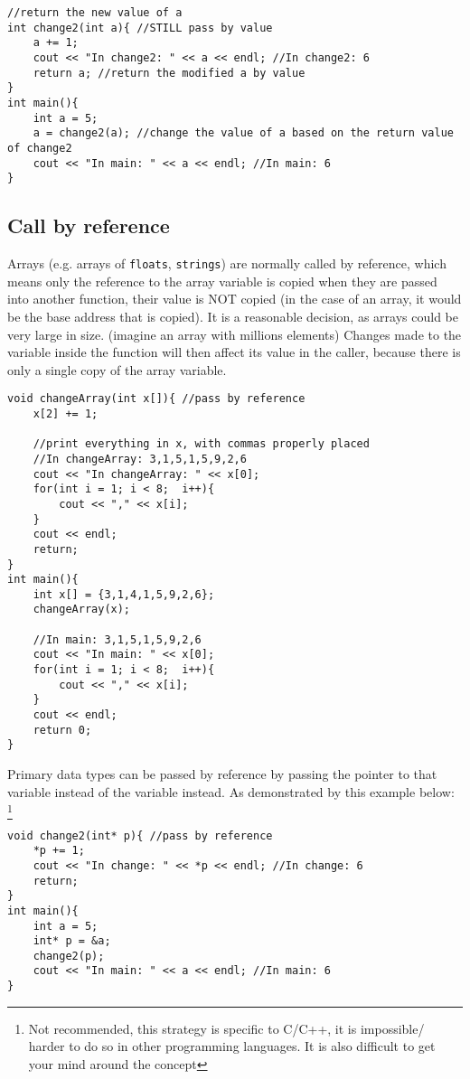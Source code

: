 \begin{lstlisting}
//return the new value of a
int change2(int a){ //STILL pass by value
    a += 1;
    cout << "In change2: " << a << endl; //In change2: 6
    return a; //return the modified a by value
}
int main(){
    int a = 5;
    a = change2(a); //change the value of a based on the return value of change2
    cout << "In main: " << a << endl; //In main: 6
}
\end{lstlisting}

\subsection{Call by reference}

Arrays (e.g. arrays of \texttt{floats}, \texttt{strings}) are normally called by reference, which means only the reference to the array variable is copied when they are passed into another function, their value is NOT copied (in the case of an array, it would be the base address that is copied). It is a reasonable decision, as arrays could be very large in size. (imagine an array with millions elements) Changes made to the variable inside the function will then affect its value in the caller, because there is only a single copy of the array variable.

\begin{lstlisting}
void changeArray(int x[]){ //pass by reference
    x[2] += 1;
    
    //print everything in x, with commas properly placed
    //In changeArray: 3,1,5,1,5,9,2,6
    cout << "In changeArray: " << x[0];
    for(int i = 1; i < 8;  i++){
        cout << "," << x[i];
    }
    cout << endl;
    return;
}
int main(){
    int x[] = {3,1,4,1,5,9,2,6};
    changeArray(x);
    
    //In main: 3,1,5,1,5,9,2,6
    cout << "In main: " << x[0];
    for(int i = 1; i < 8;  i++){
        cout << "," << x[i];
    }
    cout << endl;
    return 0;
}
\end{lstlisting}

Primary data types can be passed by reference by passing the pointer to that variable instead of the variable instead. As demonstrated by this example below: \footnote{Not recommended, this strategy is specific to C/C++, it is impossible/ harder to do so in other programming languages. It is also difficult to get your mind around the concept}

\begin{lstlisting}
void change2(int* p){ //pass by reference
    *p += 1;
    cout << "In change: " << *p << endl; //In change: 6
    return;
}
int main(){
    int a = 5;
    int* p = &a;
    change2(p);
    cout << "In main: " << a << endl; //In main: 6
}
\end{lstlisting}


